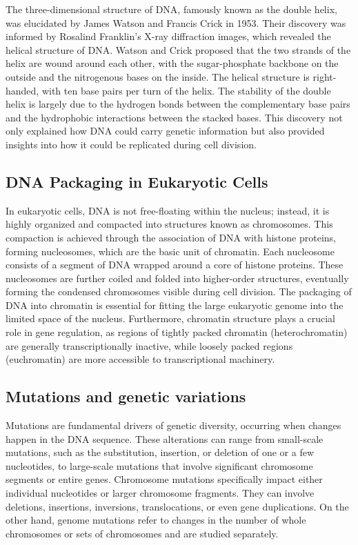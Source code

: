 The three-dimensional structure of DNA, famously known as the double helix, was elucidated by James Watson and Francis Crick in 1953. Their discovery was informed by Rosalind Franklin’s X-ray diffraction images, which revealed the helical structure of DNA. Watson and Crick proposed that the two strands of the helix are wound around each other, with the sugar-phosphate backbone on the outside and the nitrogenous bases on the inside. The helical structure is right-handed, with ten base pairs per turn of the helix. The stability of the double helix is largely due to the hydrogen bonds between the complementary base pairs and the hydrophobic interactions between the stacked bases. This discovery not only explained how DNA could carry genetic information but also provided insights into how it could be replicated during cell division. \cite{Minchin2019}

\subsection{DNA Packaging in Eukaryotic Cells}

In eukaryotic cells, DNA is not free-floating within the nucleus; instead, it is highly organized and compacted into structures known as chromosomes. This compaction is achieved through the association of DNA with histone proteins, forming nucleosomes, which are the basic unit of chromatin. Each nucleosome consists of a segment of DNA wrapped around a core of histone proteins. These nucleosomes are further coiled and folded into higher-order structures, eventually forming the condensed chromosomes visible during cell division. The packaging of DNA into chromatin is essential for fitting the large eukaryotic genome into the limited space of the nucleus. Furthermore, chromatin structure plays a crucial role in gene regulation, as regions of tightly packed chromatin (heterochromatin) are generally transcriptionally inactive, while loosely packed regions (euchromatin) are more accessible to transcriptional machinery. \cite{Minchin2019}

\subsection{Mutations and genetic variations}

Mutations are fundamental drivers of genetic diversity, occurring when changes happen in the DNA sequence. These alterations can range from small-scale mutations, such as the substitution, insertion, or deletion of one or a few nucleotides, to large-scale mutations that involve significant chromosome segments or entire genes. Chromosome mutations specifically impact either individual nucleotides or larger chromosome fragments. They can involve deletions, insertions, inversions, translocations, or even gene duplications. On the other hand, genome mutations refer to changes in the number of whole chromosomes or sets of chromosomes and are studied separately. \cite{merrick2016}

